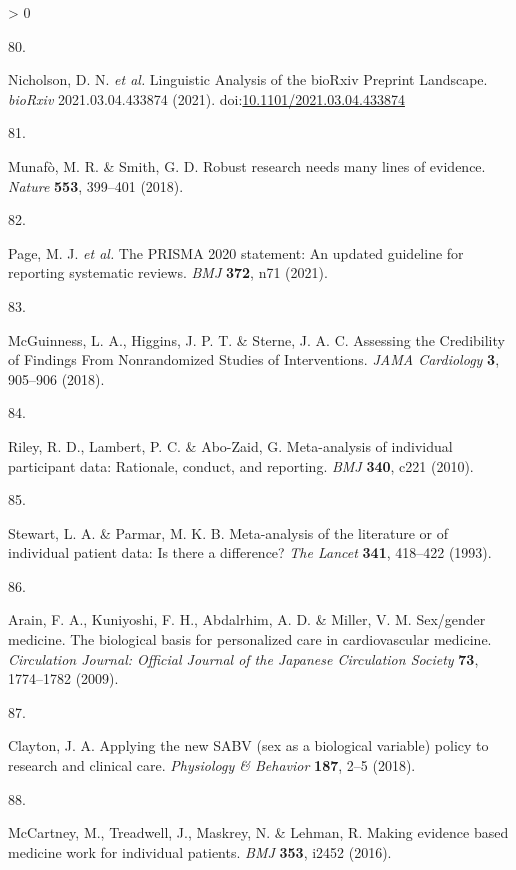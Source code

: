 \documentclass[a4paper, twoside]{templates/ociamthesis}
\newlength{\cslhangindent}
\newlength{\csllabelwidth}
\newenvironment{CSLReferences}[3] %
 {%
  \setlength{\parindent}{0pt}
  \ifodd #1 \everypar{\setlength{\hangindent}{\cslhangindent}}\ignorespaces\fi
  \ifnum #2 > 0
  \setlength{\parskip}{#2\baselineskip}
  \fi
 }%
 {}
\newcommand{\CSLLeftMargin}[1]{\parbox[t]{\maxof{\widthof{#1}}{\csllabelwidth}}{#1}}
\newcommand{\CSLRightInline}[1]{\parbox[t]{\linewidth - \csllabelwidth}{#1}}
\begin{document}
\begin{CSLReferences}{0}{0}
\leavevmode\hypertarget{ref-nicholson2021}{}%
\CSLLeftMargin{80. }
\CSLRightInline{Nicholson, D. N. \emph{et al.} Linguistic {Analysis} of the {bioRxiv Preprint Landscape}. \emph{bioRxiv} 2021.03.04.433874 (2021). doi:\href{https://doi.org/10.1101/2021.03.04.433874}{10.1101/2021.03.04.433874}}

\leavevmode\hypertarget{ref-munafo2018}{}%
\CSLLeftMargin{81. }
\CSLRightInline{Munafò, M. R. \& Smith, G. D. Robust research needs many lines of evidence. \emph{Nature} \textbf{553}, 399--401 (2018).}

\leavevmode\hypertarget{ref-page2021}{}%
\CSLLeftMargin{82. }
\CSLRightInline{Page, M. J. \emph{et al.} The {PRISMA} 2020 statement: An updated guideline for reporting systematic reviews. \emph{BMJ} \textbf{372}, n71 (2021).}

\leavevmode\hypertarget{ref-mcguinness2018}{}%
\CSLLeftMargin{83. }
\CSLRightInline{McGuinness, L. A., Higgins, J. P. T. \& Sterne, J. A. C. Assessing the {Credibility} of {Findings From Nonrandomized Studies} of {Interventions}. \emph{JAMA Cardiology} \textbf{3}, 905--906 (2018).}

\leavevmode\hypertarget{ref-riley2010}{}%
\CSLLeftMargin{84. }
\CSLRightInline{Riley, R. D., Lambert, P. C. \& Abo-Zaid, G. Meta-analysis of individual participant data: Rationale, conduct, and reporting. \emph{BMJ} \textbf{340}, c221 (2010).}

\leavevmode\hypertarget{ref-stewart1993}{}%
\CSLLeftMargin{85. }
\CSLRightInline{Stewart, L. A. \& Parmar, M. K. B. Meta-analysis of the literature or of individual patient data: Is there a difference? \emph{The Lancet} \textbf{341}, 418--422 (1993).}

\leavevmode\hypertarget{ref-arain2009}{}%
\CSLLeftMargin{86. }
\CSLRightInline{Arain, F. A., Kuniyoshi, F. H., Abdalrhim, A. D. \& Miller, V. M. Sex/gender medicine. {The} biological basis for personalized care in cardiovascular medicine. \emph{Circulation Journal: Official Journal of the Japanese Circulation Society} \textbf{73}, 1774--1782 (2009).}

\leavevmode\hypertarget{ref-clayton2018}{}%
\CSLLeftMargin{87. }
\CSLRightInline{Clayton, J. A. Applying the new {SABV} (sex as a biological variable) policy to research and clinical care. \emph{Physiology \& Behavior} \textbf{187}, 2--5 (2018).}

\leavevmode\hypertarget{ref-mccartney2016}{}%
\CSLLeftMargin{88. }
\CSLRightInline{McCartney, M., Treadwell, J., Maskrey, N. \& Lehman, R. Making evidence based medicine work for individual patients. \emph{BMJ} \textbf{353}, i2452 (2016).}


\end{CSLReferences}
\end{document}
